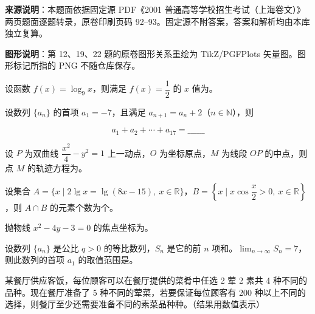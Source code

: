 


\begin{gktip}
\textbf{来源说明}：本题面依据固定源 PDF《2001 普通高等学校招生考试（上海卷文）》两页题面逐题转录，原卷印刷页码 92–93。固定源不附答案，答案和解析均由本库独立复算。

\textbf{图形说明}：第 12、19、22 题的原卷图形关系重绘为 TikZ/PGFPlots 矢量图。图形标记所指的 PNG 不随仓库保存。
\end{gktip}


\begin{question}
设函数 $f(x)=\log_9x$，则满足 $f(x)=\dfrac12$ 的 $x$ 值为\gkblank{}。

\end{question}
\begin{question}
设数列 $\{a_n\}$ 的首项 $a_1=-7$，且满足 $a_{n+1}=a_n+2$（$n\in\mathbb N$），则

\nopagebreak[4]
\[
a_1+a_2+\cdots+a_{17}=\_\_\_\_\_\_
\]

\end{question}
\begin{question}
设 $P$ 为双曲线 $\dfrac{x^2}{4}-y^2=1$ 上一动点，$O$ 为坐标原点，$M$ 为线段 $OP$ 的中点，则点 $M$ 的轨迹方程为\gkblank{}。

\end{question}
\begin{question}
设集合 $A=\{x\mid 2\lg x=\lg(8x-15),\ x\in\mathbb R\}$，$B=\left\{x\mid x\cos\dfrac{x}{2}>0,\ x\in\mathbb R\right\}$，则 $A\cap B$ 的元素个数为\gkblank{}个。

\end{question}
\begin{question}
抛物线 $x^2-4y-3=0$ 的焦点坐标为\gkblank{}。

\end{question}
\begin{question}
设数列 $\{a_n\}$ 是公比 $q>0$ 的等比数列，$S_n$ 是它的前 $n$ 项和。$\displaystyle\lim_{n\to\infty}S_n=7$，则此数列的首项 $a_1$ 的取值范围是\gkblank{}。

\end{question}
\begin{question}
某餐厅供应客饭，每位顾客可以在餐厅提供的菜肴中任选 2 荤 2 素共 4 种不同的品种。现在餐厅准备了 5 种不同的荤菜，若要保证每位顾客有 200 种以上不同的选择，则餐厅至少还需要准备不同的素菜品种\gkblank{}种。（结果用数值表示）

\end{question}
